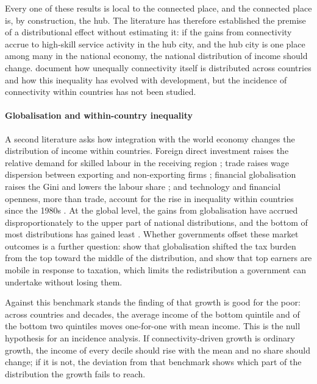 Every one of these results is local to the connected place, and the connected place is, by construction, the hub. The literature has therefore established the premise of a distributional effect without estimating it: if the gains from connectivity accrue to high-skill service activity in the hub city, and the hub city is one place among many in the national economy, the national distribution of income should change. \citet{Sun_2024} document how unequally connectivity itself is distributed across countries and how this inequality has evolved with development, but the incidence of connectivity within countries has not been studied.

\paragraph{Globalisation and within-country inequality}
A second literature asks how integration with the world economy changes the distribution of income within countries. Foreign direct investment raises the relative demand for skilled labour in the receiving region \citep{Feenstra_1997}; trade raises wage dispersion between exporting and non-exporting firms \citep{Helpman_2017}; financial globalisation raises the Gini and lowers the labour share \citep{Furceri_2019}; and technology and financial openness, more than trade, account for the rise in inequality within countries since the 1980s \citep{Jaumotte_2013}. At the global level, the gains from globalisation have accrued disproportionately to the upper part of national distributions, and the bottom of most distributions has gained least \citep{Lang_2023,Alvaredo_2018}. Whether governments offset these market outcomes is a further question: \citet{Egger_2019} show that globalisation shifted the tax burden from the top toward the middle of the distribution, and \citet{Kleven_2013} show that top earners are mobile in response to taxation, which limits the redistribution a government can undertake without losing them.

Against this benchmark stands the finding of \citet{Dollar_2016} that growth is good for the poor: across countries and decades, the average income of the bottom quintile and of the bottom two quintiles moves one-for-one with mean income. This is the null hypothesis for an incidence analysis. If connectivity-driven growth is ordinary growth, the income of every decile should rise with the mean and no share should change; if it is not, the deviation from that benchmark shows which part of the distribution the growth fails to reach.

